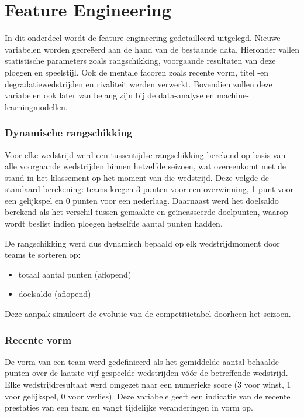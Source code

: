 \chapter{Feature Engineering}
\label{ch:feature-engineering}

In dit onderdeel wordt de feature engineering gedetailleerd uitgelegd. Nieuwe variabelen worden gecreëerd aan de hand van de bestaande data.
Hieronder vallen statistische parameters zoals rangschikking, voorgaande resultaten van deze ploegen en speelstijl. 
Ook de mentale facoren zoals recente vorm, titel -en degradatiewedstrijden en rivaliteit werden verwerkt.
Bovendien zullen deze variabelen ook later van belang zijn bij de data-analyse en machine-learningmodellen.

\vspace{5pt}

\subsection{Dynamische rangschikking}

Voor elke wedstrijd werd een tussentijdse rangschikking berekend op basis van alle voorgaande wedstrijden binnen hetzelfde seizoen, 
wat overeenkomt met de stand in het klassement op het moment van die wedstrijd.
Deze volgde de standaard berekening: teams kregen 3 punten voor een overwinning, 1 punt voor een gelijkspel en 0 punten voor een nederlaag. 
Daarnaast werd het doelsaldo berekend als het verschil tussen gemaakte en geïncasseerde doelpunten, waarop wordt beslist indien ploegen hetzelfde aantal punten hadden.

De rangschikking werd dus dynamisch bepaald op elk wedstrijdmoment door teams te sorteren op:
\begin{itemize}
    \item totaal aantal punten (aflopend)
    \item doelsaldo (aflopend)
\end{itemize}

Deze aanpak simuleert de evolutie van de competitietabel doorheen het seizoen.

\vspace{5pt}

\subsection{Recente vorm}

De vorm van een team werd gedefinieerd als het gemiddelde aantal behaalde punten over de laatste vijf gespeelde wedstrijden vóór de betreffende wedstrijd. 
Elke wedstrijdresultaat werd omgezet naar een numerieke score (3 voor winst, 1 voor gelijkspel, 0 voor verlies). 
Deze variabele geeft een indicatie van de recente prestaties van een team en vangt tijdelijke veranderingen in vorm op.

